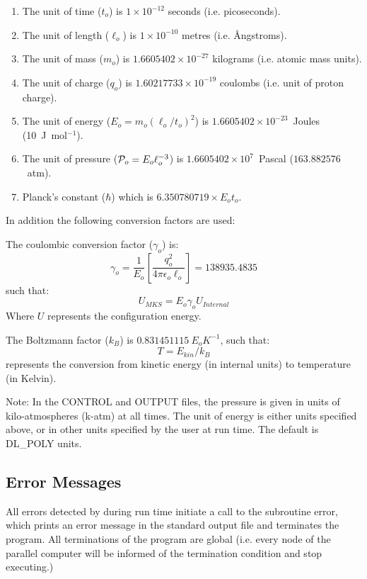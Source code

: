 \begin{enumerate}

\item The unit of time ($t_{o}$) is $1\times 10^{-12}$ seconds (i.e. picoseconds).
\item The unit of length ($\ell_{o}$) is $1\times 10^{-10}$ metres
(i.e. \AA ngstroms).
\item  The unit of mass ($m_{o}$) is $1.6605402\times 10^{-27}$
kilograms (i.e. atomic mass units).
\item The unit of charge ($q_{o}$) is $1.60217733\times 10^{-19}$
coulombs (i.e. unit of proton charge).
\item The unit of energy ($E_{o}=m_{o}(\ell_{o}/t_{o})^{2}$) is 
$1.6605402\times 10^{-23}$~Joules (10~J~mol$^{-1}$).
\item The unit of pressure (${\cal P}_{o}=E_{o}\ell_{o}^{-3}$) is 
$1.6605402\times 10^{7}$~Pascal ($163.882576$~atm).
\item Planck's constant ($\hbar$) which is $6.350780719\times E_{o}t_{o}$.
\end{enumerate}

\noindent In addition the following conversion factors are used:

\noindent The coulombic conversion factor ($\gamma_{o}$) is:
\[\gamma_{o}=\frac{1}{E_{o}} \left [
\frac{q_{o}^{2}}{4\pi\epsilon_{o}\ell_{o}}\right ]= 138935.4835 \]
such that:
\[U_{MKS}=E_{o}\gamma_{o}U_{Internal}\]
Where $U$ represents the configuration energy.

\noindent The Boltzmann factor ($k_{B}$) is $0.831451115~E_{o}K^{-1}$,
such that:
\[T=E_{kin}/k_{B}\]
represents the conversion from kinetic energy (in internal units) to
temperature (in Kelvin).

Note: In the \D{} CONTROL and OUTPUT files, the
pressure is given in units of kilo-atmospheres
(k-atm) at all times. The unit of energy is either \D{} units specified above,
or in other units specified by the user at run time. The default is
DL\_POLY units.

\subsection{Error Messages}

All errors detected by \D{} during run time initiate a call
to the subroutine {\sc error}, which prints an error message in the
standard output file and terminates the program.  All
terminations of the program are global (i.e. every node of the
parallel computer will be informed of the termination condition and
stop executing.)

